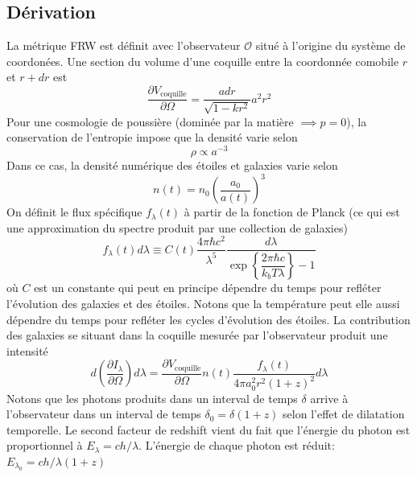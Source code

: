 \documentclass{article}
\numberwithin{equation}{section}
\begin{document}
\subsection{Dérivation}
La métrique FRW est définit avec l'observateur $\mathcal{O}$ 
situé à l'origine du système de coordonées. Une section du 
volume d'une coquille entre la coordonnée comobile $r$ et $r + dr$ est
\[
        \frac{\partial V_{\text{coquille}} }{\partial \Omega}= 
        \frac{a dr}{\sqrt{1 - kr^2}}
        a^2r^2 %
\]
Pour une cosmologie de poussière (dominée par la matière $\implies p = 0$), 
la conservation de l'entropie impose que la densité varie selon 
\[
        \rho \propto a^{-3 }
\]
Dans ce cas, la densité numérique des étoiles et galaxies varie selon
\[
        n(t) = n_0 \left( \frac{a_0}{a(t)} \right)^3
\]
On définit le flux spécifique $f_\lambda(t)$ 
à partir de la fonction de Planck (ce qui est une approximation du spectre 
produit par une collection de galaxies)
\begin{equation}\label{eq:flux} 
        f_\lambda(t)d\lambda \equiv C(t) \frac{4 \pi \hbar c^2}{\lambda^5 } 
        \frac{d\lambda}{\exp \left\{\dfrac{ 2 \pi \hbar c }{k_bT \lambda}\right\} -1 }
\end{equation} 
où $C$ est un constante qui peut en principe dépendre du temps pour refléter l'évolution des 
galaxies et des étoiles. Notons que la température peut elle aussi dépendre du temps pour 
refléter les cycles d'évolution des étoiles.
La contribution des 
galaxies se situant dans la coquille mesurée par l'observateur produit une intensité
\[
        d(\frac{\partial I_\lambda}{\partial \Omega}) d\lambda
        = \frac{\partial V_{\text{coquille}} }{\partial \Omega}n(t)\frac{f_\lambda(t) }{4 \pi a_0^2r^2(1 + z)^2}d\lambda
\]
Notons que les photons produits dans un interval de temps
$\delta $ arrive à l'observateur dans un interval de temps  
$\delta_0 = \delta (1 + z)$ selon l'effet de dilatation temporelle. Le second facteur de redshift 
vient du fait que l'énergie du photon est proportionnel à $E_\lambda = ch/\lambda$. L'énergie 
de chaque photon est réduit: $E_{\lambda_0}= ch/\lambda(1 + z)$
\end{document}
